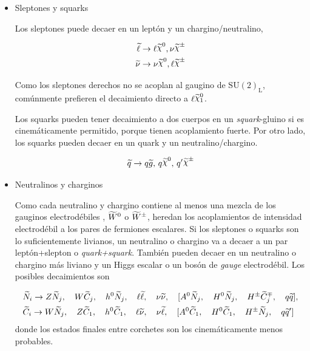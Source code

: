 \begin{itemize}\itemsep0.2cm\parskip0.2cm

\item Sleptones y squarks

  Los sleptones puede decaer en un leptón y un chargino/neutralino,

  \begin{align}
    \slepton &\to \ell \nino, \nu\chinopm \\
    \snu &\to \nu\nino, \ell\chinopm
  \end{align}

  Como los sleptones derechos no se acoplan al gaugino de $\text{SU}(2)_\text{L}$,
  comúnmente prefieren el decaimiento directo a $\ell\ninoone$.

  Los squarks pueden tener decaimiento a dos cuerpos en un \emph{squark}-gluino si es
  cinemáticamente permitido, porque tienen acoplamiento fuerte. Por otro
  lado, los squarks pueden decaer en un quark y un neutralino/chargino.

  \begin{equation}
    \susy{q} \to q\gluino, \, q\nino, \, q^\prime \chinopm
  \end{equation}


\item Neutralinos y charginos

  Como cada neutralino y chargino contiene al menos una mezcla de los gauginos
  electrodébiles {\bino}, $\widetilde{W}^0$ o $\widetilde{W}^{\pm}$, heredan los
  acoplamientos de intensidad electrodébil a los pares de fermiones escalares. Si
  los sleptones o squarks son lo suficientemente livianos, un neutralino o
  chargino va a decaer a un par leptón+slepton o \emph{quark+squark}. También pueden
  decaer en un neutralino o chargino más liviano y un Higgs escalar o un bosón
  de \emph{gauge} electrodébil. Los posibles decaimientos son

\begin{align}
  &\widetilde{N}_i \rightarrow Z \widetilde{N}_j, \quad W \widetilde{C}_j, \quad h^0 \widetilde{N}_j, \quad
  \ell \widetilde{\ell}, \quad \nu \widetilde{\nu}, \quad [A^0 \widetilde{N}_j, \quad H^0
    \widetilde{N}_j, \quad H^{\pm} \widetilde{C}_j^{\mp}, \quad q \widetilde{q}],
  \\ &\widetilde{C}_i \rightarrow W \widetilde{N}_j, \quad Z \widetilde{C}_1, \quad h^0 \widetilde{C}_1,
  \quad \ell \widetilde{\nu}, \quad \nu \widetilde{\ell}, \quad [A^0 \widetilde{C}_1, \quad H^0
    \widetilde{C}_1, \quad H^{\pm} \widetilde{N}_j, \quad q \widetilde{q}']
\end{align}
%
donde los estados finales entre corchetes son los cinemáticamente menos
probables.



\end{itemize}
